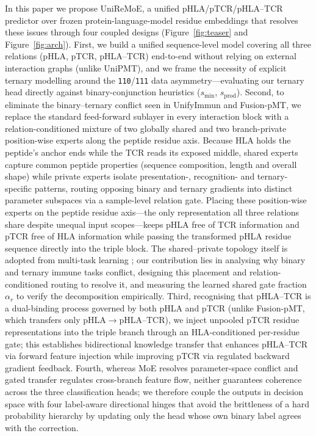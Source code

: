 \documentclass[webpdf,modern,large,namedate]{oup-authoring-template}
\theoremstyle{thmstyleone}
\theoremstyle{thmstyletwo}
\theoremstyle{thmstylethree}
\newcommand{\method}{UniReMoE}
\newcommand{\PH}{pHLA}
\newcommand{\PT}{pTCR}
\newcommand{\PHT}{pHLA--TCR}
\begin{document}
In this paper we propose \method{}, a unified \PH{}/\PT{}/\PHT{} predictor over
frozen protein-language-model residue embeddings that resolves these issues
through four coupled designs (Figure~\ref{fig:teaser} and
Figure~\ref{fig:arch}). First, we build a unified sequence-level model covering
all three relations (\PH{}, \PT{}, \PHT{}) end-to-end without relying on
external interaction graphs (unlike UniPMT), and we frame the necessity of
explicit ternary modelling around the \texttt{110}/\texttt{111} data
asymmetry---evaluating our ternary head directly against binary-conjunction
heuristics ($s_{\min}$, $s_{\mathrm{prod}}$). Second, to eliminate the
binary--ternary conflict seen in UnifyImmun and Fusion-pMT, we replace the
standard feed-forward sublayer in every interaction block with a
relation-conditioned mixture of two globally shared and two branch-private
position-wise experts along the peptide residue axis. Because HLA holds the
peptide's anchor ends while the TCR reads its exposed middle, shared experts
capture common peptide properties (sequence composition, length and overall
shape) while private experts isolate presentation-, recognition- and
ternary-specific patterns, routing opposing binary and ternary gradients into
distinct parameter subspaces via a sample-level relation gate. Placing these
position-wise experts on the peptide residue axis---the only representation all
three relations share despite unequal input scopes---keeps \PH{} free of TCR
information and \PT{} free of HLA information while passing the transformed
\PH{} residue sequence directly into the triple block. The shared--private
topology itself is adopted from multi-task learning \citep{tang2020ple}; our
contribution lies in analysing why binary and ternary immune tasks conflict,
designing this placement and relation-conditioned routing to resolve it, and
measuring the learned shared gate fraction $\alpha_r$ to verify the
decomposition empirically. Third, recognising that \PHT{} is a dual-binding process governed by both \PH{}
and \PT{} (unlike Fusion-pMT, which transfers only \PH{}$\rightarrow$\PHT{}),
we inject unpooled \PT{} residue representations into the triple branch through
an HLA-conditioned per-residue gate; this establishes bidirectional knowledge
transfer that enhances \PHT{} via forward feature injection while improving
\PT{} via regulated backward gradient feedback. Fourth, whereas MoE resolves parameter-space conflict and gated transfer
regulates cross-branch feature flow, neither guarantees coherence across the
three classification heads; we therefore couple the outputs in decision space
with four label-aware directional hinges that avoid the brittleness of a hard
probability hierarchy by updating only the head whose own binary label agrees
with the correction.
\end{document}
